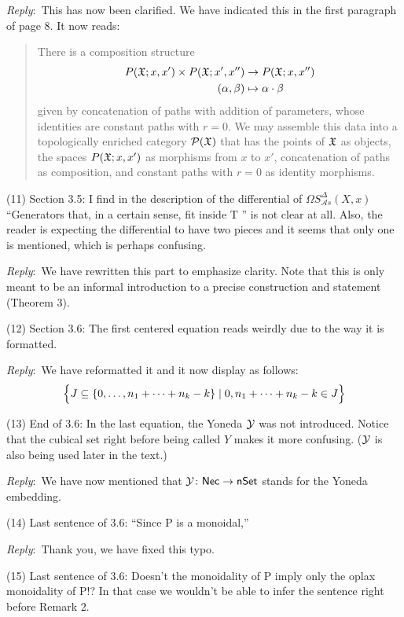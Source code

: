 \documentclass{amsart}
\newcommand{\ar}{\medskip\noindent\textit{Reply}:\ }
\newcommand{\rp}{\medskip\noindent}
\begin{document}
	\ar This has now been clarified. We have indicated this in the first paragraph of page 8.
    It now reads:
    \begin{quote}
        There is a composition structure
        \begin{equation}
        \begin{split}
            P(\fX;x,x') \times P(\fX;x',x'') &\to P(\fX;x,x'') \\
            (\alpha, \beta) &\mapsto \alpha \cdot \beta
        \end{split}
        \end{equation}
        given by concatenation of paths with addition of parameters, whose identities are constant paths with $r=0$.
        We may assemble this data into a topologically enriched category $\mathcal{P}(\fX)$ that has the points of $\fX$ as objects, the spaces $P(\fX;x,x')$ as morphisms from $x$ to $x'$, concatenation of paths as composition, and constant paths with $r=0$ as identity morphisms.
    \end{quote}

	\rp (11) Section 3.5: I find in the description of the differential of $\Omega S^\Delta_{\mathcal A s}(X, x)$ “Generators that, in a certain sense, fit inside T ” is not clear at all.
	Also, the reader is expecting the differential to have two pieces and it seems that only one is mentioned, which is perhaps confusing.

	\ar We have rewritten this part to emphasize clarity. Note that this is only meant to be an informal introduction to a precise construction and statement (Theorem 3).

	\rp (12) Section 3.6: The first centered equation reads weirdly due to the way it is
	formatted.

	\ar We have reformatted it and it now display as follows:
	\[
	\set[\Big]{J \subseteq \set{0,\dots,n_1+\cdots+n_k-k} \mid 0,n_1+\cdots+n_k-k \in J}
	\]

	\rp (13) End of 3.6: In the last equation, the Yoneda $\yoneda$ was not introduced.
	Notice that the cubical set right before being called $Y$ makes it more confusing.
	($\yoneda$ is also being used later in the text.)

	\ar We have now mentioned that $\yoneda \colon \Nec \to \nSet$ stands for the Yoneda embedding.

	\rp (14) Last sentence of 3.6: “Since P is a monoidal,”

	\ar Thank you, we have fixed this typo.

	\rp (15) Last sentence of 3.6: Doesn’t the monoidality of P imply only the oplax monoidality of P!? In that case we wouldn’t be able to infer the sentence right before Remark 2.
\end{document}
